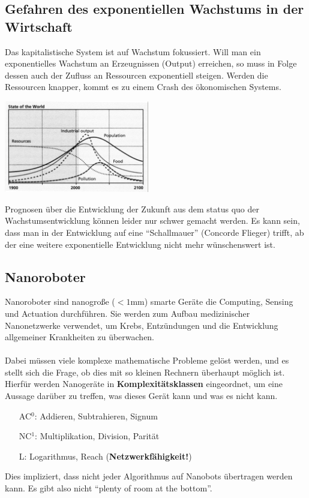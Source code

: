 \documentclass[a4paper]{article}
\begin{document}
\subsection{Gefahren des exponentiellen Wachstums in der Wirtschaft}
Das kapitalistische System ist auf Wachstum fokussiert. Will man ein exponentielles Wachstum an Erzeugnissen (Output) erreichen, so muss in Folge dessen auch der Zufluss an Ressourcen exponentiell steigen. Werden die Ressourcen knapper, kommt es zu einem Crash des ökonomischen Systems. 
\begin{center}
	\includegraphics[height = 4cm]{growth.png}
\end{center}
 Prognosen über die Entwicklung der Zukunft aus dem status quo der Wachstumsentwicklung können leider nur schwer gemacht werden. Es kann sein, dass man in der Entwicklung auf eine ``Schallmauer'' (Concorde Flieger) trifft, ab der eine weitere exponentielle Entwicklung nicht mehr wünschenswert ist.
 \subsection{Nanoroboter}
 Nanoroboter sind nanogroße ($<1$mm) smarte Geräte die Computing, Sensing und Actuation durchführen. Sie werden zum Aufbau medizinischer Nanonetzwerke verwendet, um Krebs, Entzündungen und die Entwicklung allgemeiner Krankheiten zu überwachen.\\
 \\
 
 Dabei müssen viele komplexe mathematische Probleme gelöst werden, und es stellt sich die Frage, ob dies mit so kleinen Rechnern überhaupt möglich ist. Hierfür werden Nanogeräte in \textbf{Komplexitätsklassen} eingeordnet, um eine Aussage darüber zu treffen, was dieses Gerät kann und was es nicht kann.
 \begin{itemize}
 	\item[\textsc{AC}$^0$:] Addieren, Subtrahieren, Signum
 	\item[\textsc{NC}$^1$:] Multiplikation, Division, Parität
 	\item[\textsc{L}:] Logarithmus, Reach (\textbf{Netzwerkfähigkeit!})
 \end{itemize}
Dies impliziert, dass nicht jeder Algorithmus auf Nanobots übertragen werden kann. Es gibt also nicht ``plenty of room at the bottom''.
\newpage
\end{document}
